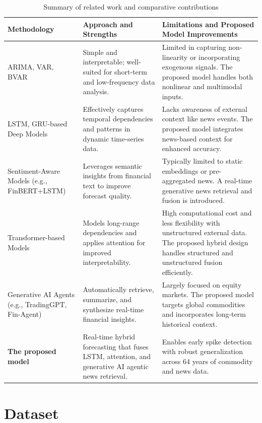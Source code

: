 \documentclass[12pt]{elsarticle}
\begin{document}
\begin{table}[H]
\centering
\caption{Summary of related work and comparative contributions}
\renewcommand{\arraystretch}{1.4}
\begin{tabular}{>{\raggedright\arraybackslash}p{3.5cm} p{5.5cm} p{5.5cm}}
\hline
\textbf{Methodology} & \textbf{Approach and Strengths} & \textbf{Limitations and Proposed Model Improvements} \\
\hline
ARIMA, VAR, BVAR \cite{Behmiri2013,Kwas2021,Baumeister2015} & Simple and interpretable; well-suited for short-term and low-frequency data analysis. & Limited in capturing non-linearity or incorporating exogenous signals. The proposed model handles both nonlinear and multimodal inputs. \\
\hline
LSTM, GRU-based Deep Models \cite{Sezer2020,Zhao2017,Chiroma2015} & Effectively captures temporal dependencies and patterns in dynamic time-series data. & Lacks awareness of external context like news events. The proposed model integrates news-based context for enhanced accuracy. \\
\hline
Sentiment-Aware Models (e.g., FinBERT+LSTM) \cite{Liu2020,Chen2024} & Leverages semantic insights from financial text to improve forecast quality. & Typically limited to static embeddings or pre-aggregated news. A real-time generative news retrieval and fusion is introduced. \\
\hline
Transformer-based Models \cite{Chen2024} & Models long-range dependencies and applies attention for improved interpretability. & High computational cost and less flexibility with unstructured external data. The proposed hybrid design handles structured and unstructured fusion efficiently. \\
\hline
Generative AI Agents (e.g., TradingGPT, Fin-Agent) \cite{Zhang2024,Li2023,Wang2024} & Automatically retrieve, summarize, and synthesize real-time financial insights. & Largely focused on equity markets. The proposed model targets global commodities and incorporates long-term historical context. \\
\hline
\textbf{The proposed model} & Real-time hybrid forecasting that fuses LSTM, attention, and generative AI agentic news retrieval. & Enables early spike detection with robust generalization across 64 years of commodity and news data. \\
\hline
\end{tabular}
\end{table}

\section{Dataset}
\label{sec:dataset}
\end{document}
